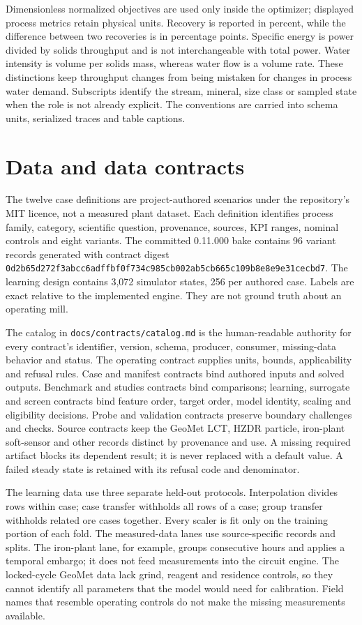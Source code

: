 \documentclass[10pt]{article}
\begin{document}
Dimensionless normalized objectives are used only inside the optimizer;
displayed process metrics retain physical units. Recovery is reported in
percent, while the difference between two recoveries is in percentage
points. Specific energy is power divided by solids throughput and is not
interchangeable with total power. Water intensity is volume per solids
mass, whereas water flow is a volume rate. These distinctions keep
throughput changes from being mistaken for changes in process water
demand. Subscripts identify the stream, mineral, size class or sampled
state when the role is not already explicit. The conventions are carried
into schema units, serialized traces and table captions.

\section{Data and data contracts}\label{data-and-data-contracts}

The twelve case definitions are project-authored scenarios under the
repository's MIT licence, not a measured plant dataset. Each definition
identifies process family, category, scientific question, provenance,
sources, KPI ranges, nominal controls and eight variants. The committed
0.11.000 bake contains 96 variant records generated with contract digest
\texttt{0d2b65d272f3abcc6adffbf0f734c985cb002ab5cb665c109b8e8e9e31cecbd7}.
The learning design contains 3,072 simulator states, 256 per authored
case. Labels are exact relative to the implemented engine. They are not
ground truth about an operating mill.

The catalog in \texttt{docs/contracts/catalog.md} is the human-readable
authority for every contract's identifier, version, schema, producer,
consumer, missing-data behavior and status. The operating contract
supplies units, bounds, applicability and refusal rules. Case and
manifest contracts bind authored inputs and solved outputs. Benchmark
and studies contracts bind comparisons; learning, surrogate and screen
contracts bind feature order, target order, model identity, scaling and
eligibility decisions. Probe and validation contracts preserve boundary
challenges and checks. Source contracts keep the GeoMet LCT, HZDR
particle, iron-plant soft-sensor and other records distinct by
provenance and use. A missing required artifact blocks its dependent
result; it is never replaced with a default value. A failed steady state
is retained with its refusal code and denominator.

The learning data use three separate held-out protocols. Interpolation
divides rows within case; case transfer withholds all rows of a case;
group transfer withholds related ore cases together. Every scaler is fit
only on the training portion of each fold. The measured-data lanes use
source-specific records and splits. The iron-plant lane, for example,
groups consecutive hours and applies a temporal embargo; it does not
feed measurements into the circuit engine. The locked-cycle GeoMet data
lack grind, reagent and residence controls, so they cannot identify all
parameters that the model would need for calibration. Field names that
resemble operating controls do not make the missing measurements
available.
\end{document}
